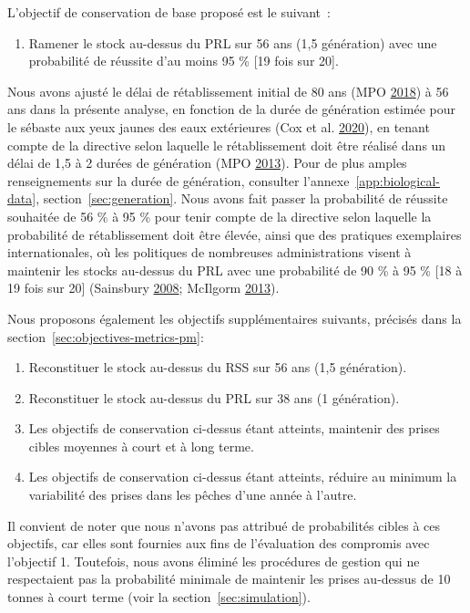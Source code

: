 \documentclass[french,11pt]{book}
\begin{document}
L'objectif de conservation de base proposé est le suivant~:
\begin{enumerate}
\def\labelenumi{\arabic{enumi}.}

\item
  Ramener le stock au-dessus du PRL sur 56 ans (1,5 génération) avec une probabilité de réussite d'au moins 95 \% {[}19 fois sur 20{]}.
\end{enumerate}
Nous avons ajusté le délai de rétablissement initial de 80 ans (MPO \protect\hyperlink{ref-ifmp2018}{2018}) à 56 ans dans la présente analyse, en fonction de la durée de génération estimée pour le sébaste aux yeux jaunes des eaux extérieures (Cox et al. \protect\hyperlink{ref-cox2020}{2020}), en tenant compte de la directive selon laquelle le rétablissement doit être réalisé dans un délai de 1,5 à 2 durées de génération (MPO \protect\hyperlink{ref-dfo2013}{2013}). Pour de plus amples renseignements sur la durée de génération, consulter l'annexe~\ref{app:biological-data}, section~\ref{sec:generation}. Nous avons fait passer la probabilité de réussite souhaitée de 56 \% à 95 \% pour tenir compte de la directive selon laquelle la probabilité de rétablissement doit être élevée, ainsi que des pratiques exemplaires internationales, où les politiques de nombreuses administrations visent à maintenir les stocks au-dessus du PRL avec une probabilité de 90 \% à 95 \% {[}18 à 19 fois sur 20{]} (Sainsbury \protect\hyperlink{ref-sainsbury2008}{2008}; McIlgorm \protect\hyperlink{ref-mcilgorm2013}{2013}).

Nous proposons également les objectifs supplémentaires suivants, précisés dans la section~\ref{sec:objectives-metrics-pm}:
\begin{enumerate}
\def\labelenumi{\arabic{enumi}.}
\setcounter{enumi}{1}
\item
  Reconstituer le stock au-dessus du RSS sur 56 ans (1,5 génération).
\item
  Reconstituer le stock au-dessus du PRL sur 38 ans (1 génération).
\item
  Les objectifs de conservation ci-dessus étant atteints, maintenir des prises cibles moyennes à court et à long terme.
\item
  Les objectifs de conservation ci-dessus étant atteints, réduire au minimum la variabilité des prises dans les pêches d'une année à l'autre.
\end{enumerate}
Il convient de noter que nous n'avons pas attribué de probabilités cibles à ces objectifs, car elles sont fournies aux fins de l'évaluation des compromis avec l'objectif 1. Toutefois, nous avons éliminé les procédures de gestion qui ne respectaient pas la probabilité minimale de maintenir les prises au-dessus de 10 tonnes à court terme (voir la section~\ref{sec:simulation}).
\end{document}
